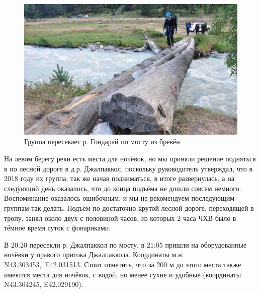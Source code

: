 \begin{figure}[h]
	\centering
	\includegraphics[width=0.7\linewidth]{../pics/DSC_1167}
	\caption{Группа пересекает р. Гондарай по мосту из бревён}
	\label{fig:hondaray}
\end{figure}

На левом берегу реки есть места для ночёвок, но мы приняли решение подняться в по лесной дороге в д.р. Джалпаккол, поскольку руководитель утверждал, что в 2018 году \cite{Korolyov2018} их группа, так же начав подниматься, в итоге развернулась, а на следующий день оказалось, что до конца подъёма не дошли совсем немного. Воспоминание оказалось ошибочным, и мы не рекомендуем последующим группам так делать. Подъём по достаточно крутой лесной дороге, переходящей в тропу, занял около двух с половиной часов, из которых 2 часа ЧХВ было в тёмное время суток с фонариками.

В 20:20 пересекли р. Джалпаккол по мосту, в 21:05 пришли на оборудованные ночёвки у правого притока Джалпаккола. Координаты м.н. N43.303453\degree,~E42.031513\degree. Стоит отметить, что за 200 м до этого места также имеются места для ночёвок, с водой, но менее сухие и удобные (координаты N43.304245\degree, E42.029190\degree).



\clearpage